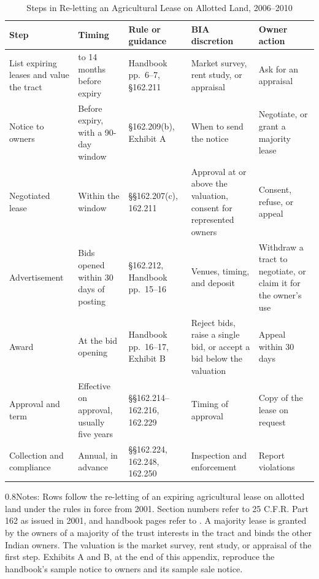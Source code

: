 \documentclass[12pt]{article}
\begin{document}
\begin{table}[H]
\centering
\caption{Steps in Re-letting an Agricultural Lease on Allotted Land, 2006--2010}
\label{tab:leasing_steps}
\footnotesize
\begin{tabular}{>{\raggedright\arraybackslash}p{2.3cm}>{\raggedright\arraybackslash}p{2.1cm}>{\raggedright\arraybackslash}p{2.8cm}>{\raggedright\arraybackslash}p{3.4cm}>{\raggedright\arraybackslash}p{3.0cm}}
\toprule
Step & Timing & Rule or guidance & BIA discretion & Owner action \\
\midrule
List expiring leases and value the tract & 10 to 14 months before expiry & Handbook pp.~6--7, \S 162.211 & Market survey, rent study, or appraisal & Ask for an appraisal \\
Notice to owners & Before expiry, with a 90-day window & \S 162.209(b), Exhibit A & When to send the notice & Negotiate, or grant a majority lease \\
Negotiated lease & Within the window & \S\S 162.207(c), 162.211 & Approval at or above the valuation, consent for represented owners & Consent, refuse, or appeal \\
Advertisement & Bids opened within 30 days of posting & \S 162.212, Handbook pp.~15--16 & Venues, timing, and deposit & Withdraw a tract to negotiate, or claim it for the owner's use \\
Award & At the bid opening & Handbook pp.~16--17, Exhibit B & Reject bids, raise a single bid, or accept a bid below the valuation & Appeal within 30 days \\
Approval and term & Effective on approval, usually five years & \S\S 162.214--162.216, 162.229 & Timing of approval & Copy of the lease on request \\
Collection and compliance & Annual, in advance & \S\S 162.224, 162.248, 162.250 & Inspection and enforcement & Report violations \\
\bottomrule
\end{tabular}
\parbox{1\textwidth}{\begin{spacing}{0.8}\small\noindent Notes: Rows follow the re-letting of an expiring agricultural lease on allotted land under the rules in force from 2001. Section numbers refer to 25 C.F.R. Part 162 as issued in 2001, and handbook pages refer to \citet{BIA2006Ch2}. A majority lease is granted by the owners of a majority of the trust interests in the tract and binds the other Indian owners. The valuation is the market survey, rent study, or appraisal of the first step. Exhibits A and B, at the end of this appendix, reproduce the handbook's sample notice to owners and its sample sale notice.\end{spacing}}
\end{table}
\end{document}
